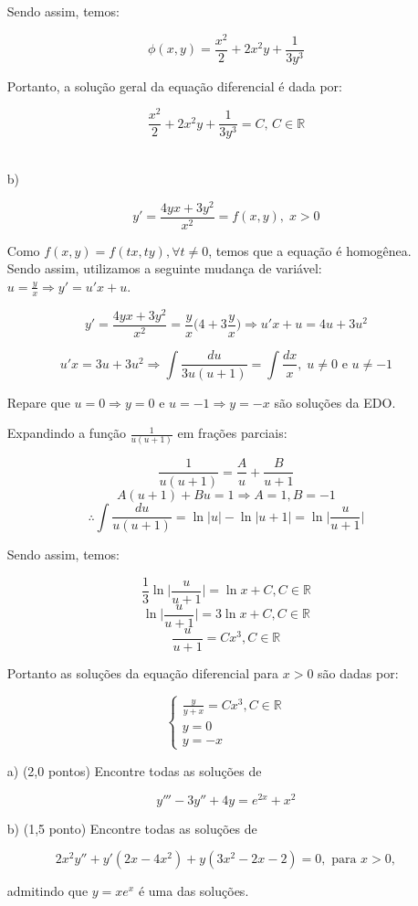 \documentclass[12pt,a4paper]{article}
\newcommand{\re}{\mathbb{R}}
\begin{document}
\begin{itemize}
Sendo assim, temos:

$$ \phi (x,y) = \frac{x^2}{2} + 2 x^2 y + \frac{1}{3 y^3} $$

Portanto, a solução geral da equação diferencial é dada por:

$$ \frac{x^2}{2} + 2 x^2 y + \frac{1}{3 y^3} = C, \, C \in \re $$ \\

    \item[b)]

$$ y' = \displaystyle\frac{4yx + 3y^2}{x^2} = f(x,y) , \; x > 0 $$

Como $ f(x,y) = f(tx,ty), \forall t \neq 0 $, temos que a equação é homogênea. Sendo assim, utilizamos a seguinte mudança de variável: $ u = \frac{y}{x} \Rightarrow y' = u'x + u $.

$$ y' = \frac{4yx + 3y^2}{x^2} =  \frac{y}{x} \Big ( 4 + 3 \frac{y}{x} \Big) \Rightarrow u'x + u = 4u + 3u^2 $$

$$ u'x = 3u + 3u^2 \Rightarrow \int \frac{du}{3u(u+1)} = \int \frac{dx}{x}, \; u \neq 0 \text{ e } u \neq -1  $$

Repare que $u=0 \Rightarrow y = 0$ e $u=-1 \Rightarrow y = -x$ são soluções da EDO.

Expandindo a função $ \frac{1}{u(u+1)} $ em frações parciais:

$$ \frac{1}{u(u+1)} = \frac{A}{u} + \frac{B}{u+1} $$
$$ A(u+1) + Bu = 1 \Rightarrow A = 1, B = -1 $$
$$ \therefore \int \frac{du}{u(u+1)} = \ln |u| - \ln |u+1| = \ln \Big| \frac{u}{u+1} \Big| $$

Sendo assim, temos:

$$ \frac{1}{3} \ln \Big| \frac{u}{u+1} \Big| = \ln x + C, C \in \re $$
$$ \ln \Big| \frac{u}{u+1} \Big| = 3\ln x + C, C \in \re $$
$$  \frac{u}{u+1} = C x^3, C \in \re $$

Portanto as soluções da equação diferencial para $ x > 0 $ são dadas por:

$$
\begin{cases}
\displaystyle\frac{y}{y+x} = C x^3, C \in \re \\
y = 0 \\
y = -x
\end{cases}
$$


\end{itemize}
\newpage


\begin{itemize}
\item[a)] (2,0 pontos) Encontre todas as soluções de

$$ y''' - 3y'' + 4y = e^{2x} + x^2 $$

\item[b)] (1,5 ponto) Encontre todas as soluções de

$$2x^2 y'' + y' (2x - 4x^2) + y (3x^2 -2x -2) = 0, \text{ para } x > 0,$$

admitindo que $y = x e^x$ é uma das soluções.

\end{itemize}
\end{document}

